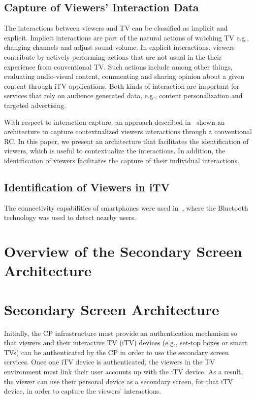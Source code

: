 \documentclass[journal]{IEEEtran}
\begin{document}
\subsection{Capture of Viewers' Interaction Data}
\label{ssec_capture_viewers_int_data}

The interactions between viewers and TV can be classified as implicit and explicit. Implicit interactions are part of the natural actions of watching TV e.g., changing channels and adjust sound volume. In explicit interactions, viewers contribute by actively performing actions that are not usual in the their experience from conventional TV. Such actions include among other things, evaluating audio-visual content, commenting and sharing opinion about a given content through iTV applications. Both kinds of interaction are important for services that rely on audience generated data, e.g., content personalization and targeted advertising.

With respect to interaction capture, an approach described in~\cite{Teixeira2010} shown an architecture to capture contextualized viewers interactions through a conventional RC. In this paper, we present an architecture that facilitates the identification of viewers, which is useful to contextualize the interactions. In addition, the identification of viewers facilitates the capture of their individual interactions.

\subsection{Identification of Viewers in iTV}
\label{ssec_ident_viewers_itv}

The connectivity capabilities of smartphones were used in~\cite{Cabarcos2011}, where the Bluetooth technology was used to detect nearby users. 

\section{Overview of the Secondary Screen Architecture}

\section{Secondary Screen Architecture}

Initially, the CP infrastructure must provide an authentication mechanism so that viewers and their interactive TV (iTV) devices (e.g., set-top boxes or smart TVs) can be authenticated by the CP in order to use the secondary screen services. Once one iTV device is authenticated, the viewers in the TV environment must link their user accounts up with the iTV device. As a result, the viewer can use their personal device as a secondary screen, for that iTV device, in order to capture the viewers' interactions.
\end{document}
